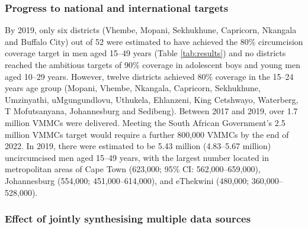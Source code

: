 \documentclass{article}
\begin{document}

\subsubsection*{Progress to national and international targets}



By 2019, only six districts (Vhembe, Mopani, Sekhukhune, Capricorn, Nkangala and Buffalo City) out of 52 were estimated to have achieved the 80\% circumcision coverage target in men aged 15--49 years (Table \ref{tab:results}) and no districts reached the ambitious targets of 90\% coverage in adolescent boys and young men aged 10--29 years. However, twelve districts achieved 80\% coverage in the 15--24 years age group (Mopani, Vhembe, Nkangala, Capricorn, Sekhukhune, Umzinyathi, uMgungundlovu, Uthukela, Ehlanzeni, King Cetshwayo, Waterberg, T Mofutsanyana, Johannesburg and Sedibeng). Between 2017 and 2019, over 1.7 million VMMCs were delivered. Meeting the South African Government's 2.5 million VMMCs target would require a further 800,000 VMMCs by the end of 2022. In 2019, there were estimated to be 5.43 million (4.83--5.67 million) uncircumcised men aged 15--49 years, with the largest number located in metropolitan areas of Cape Town (623,000; 95\% CI: 562,000--659,000), Johannesburg (554,000; 451,000--614,000), and eThekwini (480,000; 360,000--528,000).


\subsubsection*{Effect of jointly synthesising multiple data sources}


\end{document}
